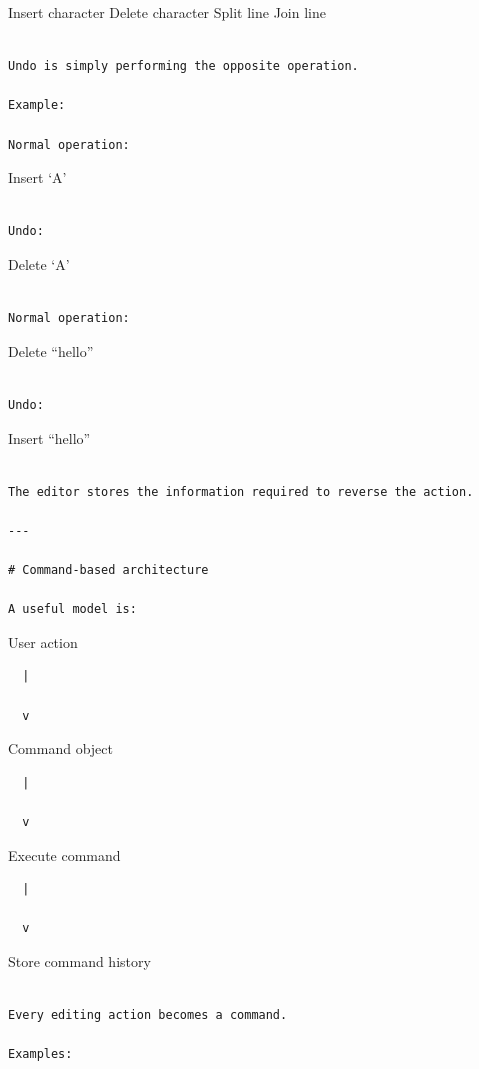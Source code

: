 \documentclass[
  oneside,
  openany]{book}
\begin{document}
Insert character Delete character Split line Join line

\begin{verbatim}

Undo is simply performing the opposite operation.

Example:

Normal operation:
\end{verbatim}

Insert `A'

\begin{verbatim}

Undo:
\end{verbatim}

Delete `A'

\begin{verbatim}

Normal operation:
\end{verbatim}

Delete ``hello''

\begin{verbatim}

Undo:
\end{verbatim}

Insert ``hello''

\begin{verbatim}

The editor stores the information required to reverse the action.

---

# Command-based architecture

A useful model is:
\end{verbatim}

User action

\begin{verbatim}
  |

  v
\end{verbatim}

Command object

\begin{verbatim}
  |

  v
\end{verbatim}

Execute command

\begin{verbatim}
  |

  v
\end{verbatim}

Store command history

\begin{verbatim}

Every editing action becomes a command.

Examples:
\end{verbatim}
\end{document}
